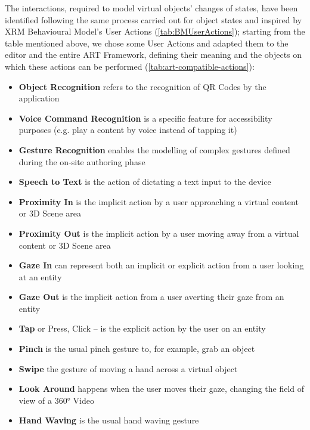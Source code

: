 The interactions, required to model virtual objects' changes of states, have been identified following the same process carried out for object states and inspired by XRM Behavioural Model's User Actions (\autoref{tab:BMUserActions}); starting from the table mentioned above, we chose some User Actions and adapted them to the editor and the entire ART Framework, defining their meaning and the objects on which these actions can be performed (\autoref{tab:art-compatible-actions}):
\begin{itemize}
    \item \textbf{Object Recognition} refers to the recognition of QR Codes by the application
    \item \textbf{Voice Command Recognition} is a specific feature for accessibility purposes (e.g. play a content by voice instead of tapping it)
    \item \textbf{Gesture Recognition} enables the modelling of complex gestures defined during the on-site authoring phase
    \item \textbf{Speech to Text} is the action of dictating a text input to the device
    \item \textbf{Proximity In} is the implicit action by a user approaching a virtual content or 3D Scene area
    \item \textbf{Proximity Out} is the implicit action by a user moving away from a virtual content or 3D Scene area
    \item \textbf{Gaze In} can represent both an implicit or explicit action from a user looking at an entity
    \item \textbf{Gaze Out} is the implicit action from a user averting their gaze from an entity
    \item \textbf{Tap} or Press, Click -- is the explicit action by the user on an entity
    \item \textbf{Pinch} is the usual pinch gesture to, for example, grab an object
    \item \textbf{Swipe} the gesture of moving a hand across a virtual object
    \item \textbf{Look Around} happens when the user moves their gaze, changing the field of view of a 360° Video
    \item \textbf{Hand Waving} is the usual hand waving gesture
\end{itemize}

